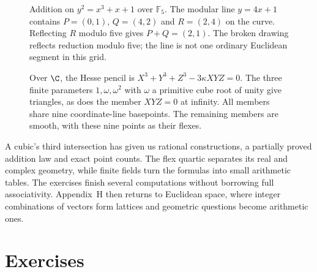 \FloatBarrier
\begin{figure}[ht]
\centering
{}
\caption{Addition on $y^2=x^3+x+1$ over $\mathbb F_5$. The modular line $y=4x+1$ contains $P=(0,1)$, $Q=(4,2)$ and $R=(2,4)$ on the curve. Reflecting $R$ modulo five gives $P+Q=(2,1)$. The broken drawing reflects reduction modulo five; the line is not one ordinary Euclidean segment in this grid.}
\label{fig:v9-modular-chord}
\end{figure}
\begin{figure}[ht]
\centering
{}
\caption{Over $\C$, the Hesse pencil is $X^3+Y^3+Z^3-3\kappa XYZ=0$. The three finite parameters $1,\omega,\omega^2$ with $\omega$ a primitive cube root of unity give triangles, as does the member $XYZ=0$ at infinity. All members share nine coordinate-line basepoints. The remaining members are smooth, with these nine points as their flexes.}
\label{fig:v9-hesse-pencil}
\end{figure}
\FloatBarrier

A cubic's third intersection has given us rational constructions, a partially proved addition law and exact point counts. The flex quartic separates its real and complex geometry, while finite fields turn the formulas into small arithmetic tables. The exercises finish several computations without borrowing full associativity. Appendix~H then returns to Euclidean space, where integer combinations of vectors form lattices and geometric questions become arithmetic ones.
\FloatBarrier

\section{Exercises}

